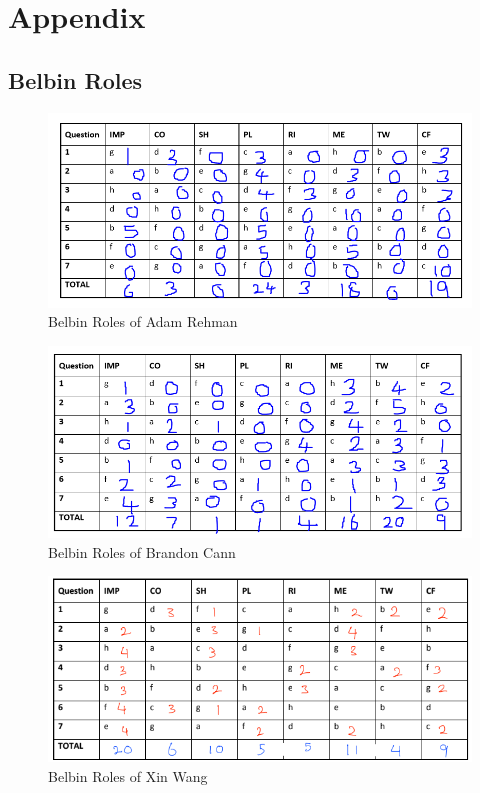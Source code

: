 \documentclass[12pt,a4paper]{article}
\begin{document}
\section{Appendix}
\subsection{Belbin Roles}
\begin{figure} [h!]
	\centering
	\includegraphics[scale=0.5]{Adam.PNG}
	\caption{Belbin Roles of Adam Rehman}
\end{figure}
\begin{figure} [h!]
	\centering
	\includegraphics[scale=0.5]{Brandon.PNG}
	\caption{Belbin Roles of Brandon Cann}
\end{figure}
\begin{figure} [h!]
	\centering
	\includegraphics[scale=0.75]{Xin.PNG}
	\caption{Belbin Roles of Xin Wang}
\end{figure}
\pagebreak
\end{document}
